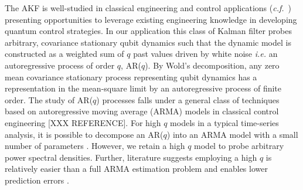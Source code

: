 \documentclass[pra, reprint]{revtex4-1}
\begin{document}
The AKF is well-studied in classical engineering and control applications (\emph{c.f.}~\cite{moon2006real}) presenting opportunities to leverage existing engineering knowledge in developing quantum control strategies.  In our application this class of Kalman filter probes arbitrary, covariance stationary qubit dynamics such that the dynamic model is constructed as a weighted sum of $q$ past values driven by white noise {\em i.e.} an autoregressive process of order $q$, AR($q$). By Wold's decomposition, any zero mean covariance stationary process representing qubit dynamics has a representation in the mean-square limit by an autoregressive process of finite order.%
The study of AR($q$) processes falls under a general class of techniques based on autoregressive moving average (ARMA) models in classical control engineering [XXX REFERENCE]. For high $q$ models in a typical time-series analysis, it is possible to decompose an AR($q$) into an ARMA model with a small number of parameters \cite{brockwell1996introduction, salzmann1991detection}. However, we retain a high $q$ model to probe arbitrary power spectral densities. Further, literature suggests employing a high $q$ is relatively easier than a full ARMA estimation problem and enables lower prediction errors \cite{wahlberg1989estimation,brockwell1996introduction}.
\end{document}
